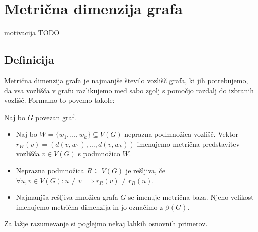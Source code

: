\documentclass[mat1, tisk]{fmfdelo}
\newcommand{\1}{(1, 1, \ldots, 1)}
\newcommand{\2}{(2, 2, \ldots, 2)}
\begin{document}


\section{Metrična dimenzija grafa} \label{s:mdim}

motivacija TODO



\subsection{Definicija} \label{ss:def_mdim}

Metrična dimenzija grafa je najmanjše število vozlišč grafa, ki jih potrebujemo, da
vsa vozlišča v grafu razlikujemo med sabo zgolj s pomočjo razdalj do izbranih vozlišč.
Formalno to povemo takole:

\begin{definicija} \label{def:mdim}
    Naj bo $G$ povezan graf. 
    \begin{itemize}
        \item Naj bo $W = \{ w_1, \ldots , w_k  \} \subseteq V(G)$ neprazna podmnožica vozlišč. 
        Vektor $r_W(v) = (d(v, w_1), \ldots, d(v, w_k))$ imenujemo metrična 
        predstavitev vozlišča $v \in V(G)$ s podmnožico $W$.
        \item Neprazna podmnožica $R \subseteq V(G)$ je rešljiva,
        če $\forall u, v \in V(G): u \neq v \implies r_R(v) \neq r_R(u)$.
        \item Najmanjša rešljiva množica grafa $G$ se imenuje metrična baza. Njeno velikost imenujemo 
        metrična dimenzija in jo označimo z $\beta(G).$
    \end{itemize}
\end{definicija}

Za lažje razumevanje si poglejmo nekaj lahkih osnovnih primerov.
\end{document}
